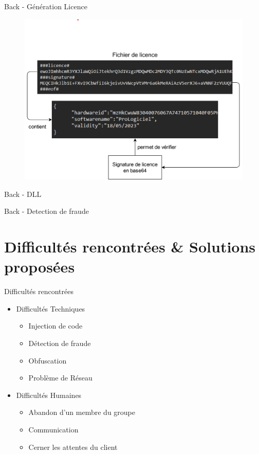 \documentclass{cubeamer}
\begin{document}
\begin{frame}{Back - Génération Licence}
    \begin{figure}
        \includegraphics[scale=0.4]{img/licence.png}
    \end{figure}    
\end{frame}

\begin{frame}{Back - DLL}
    
\end{frame}

\begin{frame}{Back - Detection de fraude}
    
\end{frame}

\section{Difficultés rencontrées \& Solutions proposées}

\begin{frame}{Difficultés rencontrées}
    \begin{itemize}
        \item Difficultés Techniques 
              \begin{itemize}
                \item Injection de code
                \item Détection de fraude
                \item Obfuscation
                \item Problème de Réseau
              \end{itemize}
        \item Difficultés Humaines
              \begin{itemize}
                \item Abandon d'un membre du groupe
                \item Communication
                \item Cerner les attentes du client
              \end{itemize}
    \end{itemize}
\end{frame}
\end{document}
